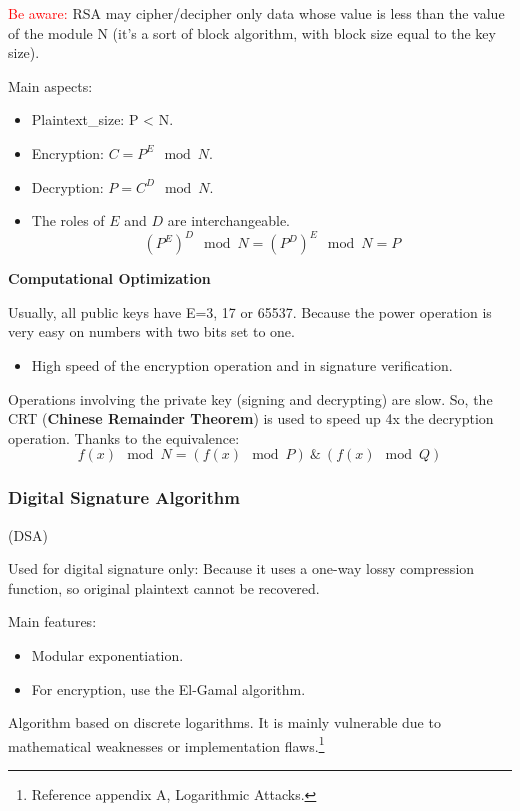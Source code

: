 \noindent\textcolor{Red}{Be aware:} RSA may cipher/decipher only data whose value is less than the value of the module N (it's a sort of block algorithm, with block size equal to the key size).

\noindent Main aspects:
\begin{itemize}
    \item Plaintext\_size: P < N.
    \item Encryption: $C = P^E \mod N$.
    \item Decryption: $P = C^D \mod N$.
    \item The roles of $E$ and $D$ are interchangeable.
    \[
        (P^E)^D \mod N = (P^D)^E \mod N = P
    \]
\end{itemize}

\begin{center}
    \textbf{Computational Optimization}
\end{center}

Usually, all public keys have E=3, 17 or 65537. Because the power operation is very easy on numbers with two bits set to one.
\begin{itemize}
    \item High speed of the encryption operation and in signature verification.
\end{itemize}
Operations involving the private key (signing and decrypting) are slow. So, the CRT (\textbf{Chinese Remainder Theorem}) is used to speed up 4x the decryption operation.
Thanks to the equivalence: 
\[
    f(x) \mod N = (f(x) \mod P)\ \&\ (f(x) \mod Q)
\]


\subsubsection{Digital Signature Algorithm}
\begin{center}
    (DSA)
\end{center}
Used for digital signature only: Because it uses a one-way lossy compression function, so original plaintext cannot be recovered.

Main features:
\begin{itemize}
    \item Modular exponentiation.
    \item For encryption, use the El-Gamal algorithm.
\end{itemize}

\begin{tcolorbox}[colback=red!10!white, colframe=red!70!black, coltitle=white, title=Beware]
    Algorithm based on discrete logarithms. It is mainly vulnerable due to mathematical weaknesses or implementation flaws.\footnote{Reference appendix A, Logarithmic Attacks.}
\end{tcolorbox}

